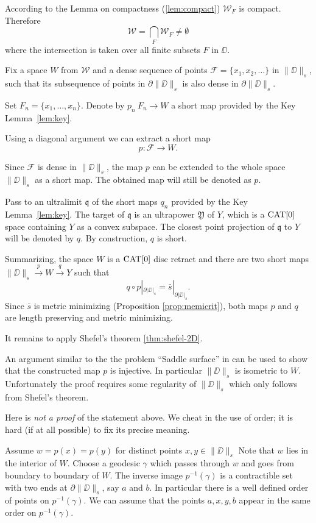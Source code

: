 \documentclass[a4paper,10pt]{amsart}
\begin{document}
According to the Lemma on compactness (\ref{lem:compact}) $\mathcal{W}_F$ is compact.
Therefore 
\[\mathcal{W}
=
\bigcap_{F}\mathcal{W}_F\ne \emptyset\]
where the intersection is taken over all finite subsets $F$ in $\DD$. 

Fix a space $W$ from $\mathcal{W}$
and a dense sequence of points $\mathcal{F}=\{x_1,x_2,\dots\}$ in $\|\DD\|_s$, 
such that its subsequence of points in $\partial \|\DD\|_s$ is
 also dense in $\partial \|\DD\|_s$.

Set $F_n=\{x_1,\dots,x_n\}$.
Denote by $p_n\:F_n\to W$ a short map provided by the Key Lemma~\ref{lem:key}.

Using a diagonal argument we can extract a short map \[p:\mathcal{F}\to W.\]

Since $\mathcal{F}$ is dense in $\|\DD\|_s$,
the map $p$ can be extended to the whole space $\|\DD\|_s$ 
as a short map.
The obtained map will still be denoted as $p$.

Pass to an ultralimit $\mathfrak{q}$ of the short maps $q_n$ provided by the Key Lemma~\ref{lem:key}. The target of $\mathfrak{q}$ is an ultrapower  $\mathfrak{Y}$ of $Y$,
which is a $\mathop{\rm CAT}\nolimits[0]$ space containing $Y$ as a convex subspace.
The closest point projection of $\mathfrak{q}$ to $Y$ will be denoted by $q$.
By construction, $q$ is short.


Summarizing, the space $W$ is a $\mathop{\rm CAT}\nolimits[0]$ disc retract and
 there are two short maps 
$\|\DD\|_s\xrightarrow{p} W \xrightarrow{q} Y$
such that 
\[q\circ p|_{\partial|\DD|_s}=\bar s|_{\partial|\DD|_s}.\] 
Since $\bar s$ is metric minimizing (Proposition \ref{prop:memicrit}), both maps $p$ and $q$ are length preserving and metric minimizing.

It remains to apply Shefel's theorem \ref{thm:shefel-2D}.


\qeds



 An argument similar to the the problem ``Saddle surface'' in \cite{petrunin-orthodox}
can be used to show that the constructed map $p$ 
is injective. 
In particular $\|\DD\|_s$ is isometric to $W$.
Unfortunately the proof requires some regularity of $\|\DD\|_s$ which only follows from Shefel's theorem. 

Here is \emph{not a proof} of the statement above.
We cheat in the use of order; 
it is hard (if at all possible) to fix its precise meaning.

 Assume  $w=p(x)=p(y)$ for distinct points $x,y\in\|\DD\|_s$
Note that  $w$ lies in the interior of $W$.
Choose a geodesic $\gamma$ which passes through $w$ and goes 
from boundary to boundary of $W$.
The inverse image $p^{-1}(\gamma)$ is a contractible set with two ends at $\partial\|\DD\|_s$, say $a$ and $b$.
In particular there is a well defined order of  points on $p^{-1}(\gamma)$.
We can assume that the points $a,x,y,b$ appear in the same order on $p^{-1}(\gamma)$. 
\end{document}
